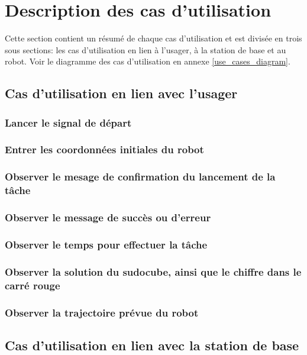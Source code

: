 


\chapter{Description des cas d'utilisation}
\label{s:utilisation}
Cette section contient un résumé de chaque cas d'utilisation et est divisée en trois sous sections: les cas d'utilisation en lien à l'usager, à la station de base et au robot. 
Voir le diagramme des cas d'utilisation en annexe \ref{use_cases_diagram}.
\section{Cas d'utilisation en lien avec l'usager}
\subsection{Lancer le signal de départ}
\subsection{Entrer les coordonnées initiales du robot}
\subsection{Observer le mesage de confirmation du lancement de la tâche}
\subsection{Observer le message de succès ou d'erreur}
\subsection{Observer le temps pour effectuer la tâche}
\subsection{Observer la solution du sudocube, ainsi que le chiffre dans le carré rouge}
\subsection{Observer la trajectoire prévue du robot}
\section{Cas d'utilisation en lien avec la station de base}
